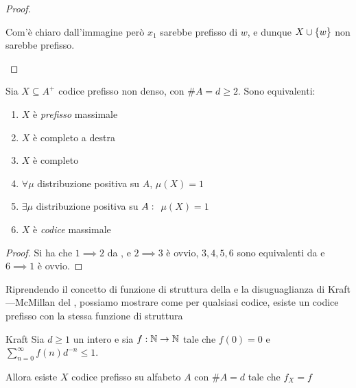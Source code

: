 \begin{proof}
\begin{description}
\begin{figure}[H]
  \end{figure}
  Com'è chiaro dall'immagine però \(x_1\) sarebbe prefisso di \(w\), e dunque \(X\cup\set{w}\) non sarebbe prefisso.
  \end{description}
\end{proof}

\begin{corollary}{}
  Sia \(X \subseteq A^+\) codice prefisso non denso, con \(\# A = d \geq 2\). Sono equivalenti:
  \begin{enumerate}
    \item \(X\) è \textit{prefisso} massimale
    \item \(X\) è completo a destra
    \item \(X\) è completo
    \item \(\forall \mu\) distribuzione positiva su \(A\), \(\mu(X) = 1\)
    \item \(\exists \mu\) distribuzione positiva su \(A:\;\) \(\mu(X) = 1\)
    \item \(X\) è \textit{codice} massimale
  \end{enumerate}
\end{corollary}

\begin{proof}
  Si ha che \(1 \implies 2\) da , e \(2 \implies 3\) è ovvio, \(3,4,5,6\) sono equivalenti da  e \(6 \implies 1\) è ovvio.
\end{proof}

Riprendendo il concetto di funzione di struttura della  e la disuguaglianza di Kraft---McMillan del , possiamo mostrare come per qualsiasi codice, esiste un codice prefisso con la stessa funzione di struttura

\begin{theorem}[label=thm:kraft]{Kraft}
  Sia \(d \geq 1\) un intero e sia \(f: \mathbb{N} \to \mathbb{N}\) tale che \(f(0) = 0\) e \(\sum_{n=0}^\infty f(n)d^{-n} \leq 1\). 
  
  Allora esiste \(X\) codice prefisso su alfabeto \(A\) con \(\#A = d\) tale che \(f_X = f\)
\end{theorem}

